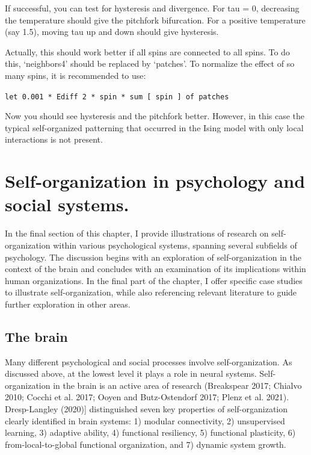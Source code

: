\documentclass[
  letterpaper,
]{scrbook}
\begin{document}
If successful, you can test for hysteresis and divergence. For tau = 0,
decreasing the temperature should give the pitchfork bifurcation. For a
positive temperature (say 1.5), moving tau up and down should give
hysteresis.

Actually, this should work better if all spins are connected to all
spins. To do this, `neighbors4' should be replaced by `patches'. To
normalize the effect of so many spins, it is recommended to use:

\texttt{let\ 0.001\ *\ Ediff\ 2\ *\ spin\ *\ sum\ {[}\ spin\ {]}\ of\ patches}

Now you should see hysteresis and the pitchfork better. However, in this
case the typical self-organized patterning that occurred in the Ising
model with only local interactions is not present.

\hypertarget{self-organization-in-psychology-and-social-systems.}{%
\section{Self-organization in psychology and social
systems.}\label{self-organization-in-psychology-and-social-systems.}}

In the final section of this chapter, I provide illustrations of
research on self-organization within various psychological systems,
spanning several subfields of psychology. The discussion begins with an
exploration of self-organization in the context of the brain and
concludes with an examination of its implications within human
organizations. In the final part of the chapter, I offer specific case
studies to illustrate self-organization, while also referencing relevant
literature to guide further exploration in other areas.

\hypertarget{the-brain}{%
\subsection{The brain}\label{the-brain}}

Many different psychological and social processes involve
self-organization. As discussed above, at the lowest level it plays a
role in neural systems. Self-organization in the brain is an active area
of research (Breakspear 2017; Chialvo 2010; Cocchi et al. 2017; Ooyen
and Butz-Ostendorf 2017; Plenz et al. 2021). Dresp-Langley (2020){]}
distinguished seven key properties of self-organization clearly
identified in brain systems: 1) modular connectivity, 2) unsupervised
learning, 3) adaptive ability, 4) functional resiliency, 5) functional
plasticity, 6) from-local-to-global functional organization, and 7)
dynamic system growth.
\end{document}
